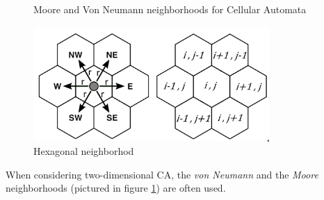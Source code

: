 \begin{figure}
  \centering
  \hspace{1cm}%
  \caption{Moore and Von Neumann neighborhoods for Cellular Automata}
  \label{fig:2d_n}
\end{figure}

\begin{figure}
  \centering
    \includegraphics[width=0.8\textwidth]{hex_n}%
    
  \caption{Hexagonal neighborhod \cite{hex_phy}}
  \label{fig:hex_n}
\end{figure}

When considering two-dimensional CA, the \textit{von Neumann} and the \textit{Moore} neighborhoods (pictured in figure \ref{fig:2d_n}) are often used.

